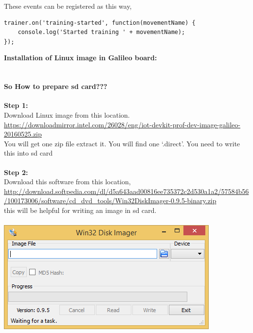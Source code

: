 \documentclass[11pt,a4paper]{article}
\newcommand\tab[1][1cm]{\hspace*{#1}}
\begin{document}
\vspace{.5cm}
These events can be registered as this way,
\vspace{.5cm}
\begin{lstlisting}
trainer.on('training-started', function(movementName) {
    console.log('Started training ' + movementName);
});
\end{lstlisting}
\newpage
\textbf{\huge{Installation of Linux image in Galileo board:}}
	\vspace{1cm}\\
	\tab{In Galileo board, we can install Linux, windows IOT or os x. So the interface with board become easy. Here we will use Linux image. For that, we need to write Linux image on the sd card. From sd card, Galileo board will boot.}\\
	\vspace{.5cm}\\
	\textbf{\Large{So How to prepare sd card???}}\\
	\vspace{.3cm}\\
	\textbf{Step 1:}\\
	Download Linux image from this location.\\
	\url{https://downloadmirror.intel.com/26028/eng/iot-devkit-prof-dev-image-galileo-20160525.zip}\\
	You will get one zip file extract it. You will find one ‘.direct’. You need to write this into sd card\\
	\vspace{.3cm}\\
	\textbf{Step 2:}\\
	Download this software from this location,\\
\url{http://download.softpedia.com/dl/d5a643aad00816ee735372c2d530a1a2/57584b56/100173006/software/cd_dvd_tools/Win32DiskImager-0.9.5-binary.zip}\\
this will be helpful for writing an image in sd card.\\
\vspace{.3cm}\\
\includegraphics[width=\linewidth]{1.png}
\end{document}
